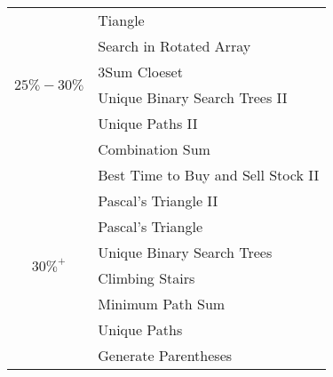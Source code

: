 \documentclass[paper=a4, fontsize=11pt]{scrartcl} %
\begin{document}
\begin{center}
\begin{tabular}{|c|l|}
      \multirow{6}{*}{$25\%-30\%$}  &   Tiangle\\
          & Search in Rotated Array\\
          & 3Sum Cloeset\\
          & Unique Binary Search Trees II\\
          & Unique Paths II\\
          & Combination Sum\\
      \hline
      \multirow{8}{*}{$30\%^+$}  &   Best Time to Buy and Sell Stock II \\
          & Pascal's Triangle II \\
          & Pascal's Triangle \\
          & Unique Binary Search Trees \\
          & Climbing Stairs\\
          & Minimum Path Sum\\
          & Unique Paths\\
          & Generate Parentheses\\
      \hline
  \end{tabular}

\end{center}
\end{document}
